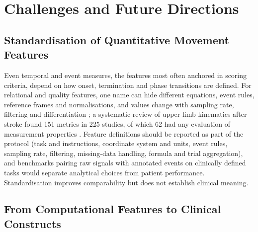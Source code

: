 \documentclass[11pt]{article}
\begin{document}
\section{Challenges and Future Directions}
\label{sec:challenge}

\subsection{Standardisation of Quantitative Movement Features}

Even temporal and event measures, the features most often anchored in scoring criteria, depend on how onset, termination and phase transitions are defined. For relational and quality features, one name can hide different equations, event rules, reference frames and normalisations, and values change with sampling rate, filtering and differentiation \cite{Jung2017MovementQuality,Proffitt2023DepthMovement,Yang2013SpatiotemporalGait,S3Stenum202438530801}; a systematic review of upper-limb kinematics after stroke found 151 metrics in 225 studies, of which 62 had any evaluation of measurement properties \cite{Schwarz2019UpperLimbKinematicsSR}. Feature definitions should be reported as part of the protocol (task and instructions, coordinate system and units, event rules, sampling rate, filtering, missing-data handling, formula and trial aggregation), and benchmarks pairing raw signals with annotated events on clinically defined tasks would separate analytical choices from patient performance. Standardisation improves comparability but does not establish clinical meaning.

\subsection{From Computational Features to Clinical Constructs}
\label{sec:constructs}
\end{document}
